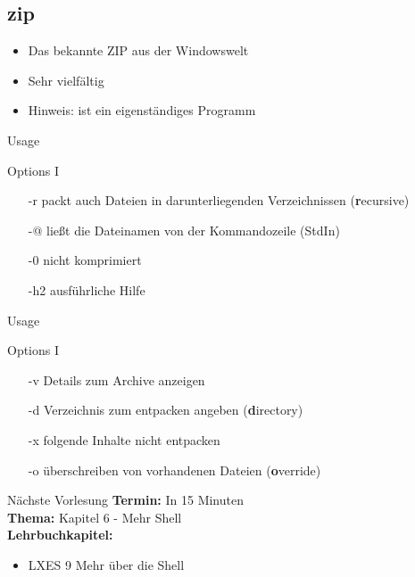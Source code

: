 \documentclass[aspectratio=43]{beamer}
\begin{document}
\subsection{zip}
\begin{frame} 
	\begin{block}{} 
	\begin{itemize}
	\item Das bekannte ZIP aus der Windowswelt
	\item Sehr vielfältig
	\item Hinweis:  ist ein eigenständiges Programm
	\end{itemize}
	\end{block}
\end{frame}

\begin{frame} 
	\begin{exampleblock}{Usage}
	\end{exampleblock}

	\begin{exampleblock}{Options I}
	\begin{itemize}
	\item[-r] packt auch Dateien in darunterliegenden Verzeichnissen (\textbf{r}ecursive)
	\item[-@] ließt die Dateinamen von der Kommandozeile (StdIn)
	\item[-0] nicht komprimiert
	\item[-h2] ausführliche Hilfe
	\end{itemize}
	\end{exampleblock}
\end{frame}

\begin{frame} 
	\begin{exampleblock}{Usage}
	\end{exampleblock}

	\begin{exampleblock}{Options I}
	\begin{itemize}
	\item[-v] Details zum Archive anzeigen
	\item[-d] Verzeichnis zum entpacken angeben (\textbf{d}irectory)
	\item[-x] folgende Inhalte nicht entpacken
	\item[-o] überschreiben von vorhandenen Dateien (\textbf{o}verride)
	\end{itemize}
	\end{exampleblock}
\end{frame}



\begin{frame}[plain]
\begin{alertblock}{Nächste Vorlesung}
\textbf{Termin:} In 15 Minuten\\
\textbf{Thema:} Kapitel 6 - Mehr Shell \\
\textbf{Lehrbuchkapitel:} 
\begin{itemize}
\item LXES 9 Mehr über die Shell
\end{itemize}
\end{alertblock}
\end{frame}

\materialframe
\versionframe
\end{document}
